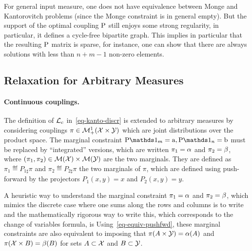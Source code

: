 \begin{rem} For general input measure, one does not have equivalence between Monge and Kantorovitch problems (since the Monge constraint is in general empty). But the support of the optimal coupling $\P$ still enjoys some strong regularity, in particular, it defines a cycle-free bipartite graph. This implies in particular that the resulting $\P$ matrix is sparse, for instance, one can show that there are always solutions with less than $n+m-1$ non-zero elements.	
\end{rem}

\subsection{Relaxation for Arbitrary Measures}

\paragraph{Continuous couplings.}

The definition of $\MK_\c$ in~\eqref{eq-kanto-discr} is extended to arbitrary measures by considering couplings $\pi \in \Mm_+^1(\X \times \Y)$ which are joint distributions over the product space. 
%
The marginal constraint $\P\ones_m=\a, \P\ones_n=\b$ must be replaced by ``integrated'' versions, which are written $\pi_1 = \al$ and $\pi_2 = \be$, where $(\pi_1,\pi_2) \in \Mm(\Xx) \times \Mm(\Yy)$ are the two marginals. 
%
They are defined as $\pi_1 \eqdef P_{1\sharp} \pi$ and $\pi_2 \eqdef P_{2\sharp} \pi$ the two marginals of $\pi$, which are defined using push-forward by the projectors $P_1(x,y)=x$ and $P_2(x,y)=y$.

A heuristic way to understand the marginal constraint $\pi_1 = \al$ and $\pi_2 = \be$, which mimics the discrete case where one sums along the rows and columns is to write
and the mathematically rigorous way to write this, which corresponds to the change of variables formula, is 
%
Using~\eqref{eq-equiv-pushfwd}, these marginal constraints are also equivalent to imposing that $\pi(A \times \Y)=\al(A)$ and $\pi(\X \times B)=\be(B)$ for sets $A \subset \X$ and $B \subset \Y$.


